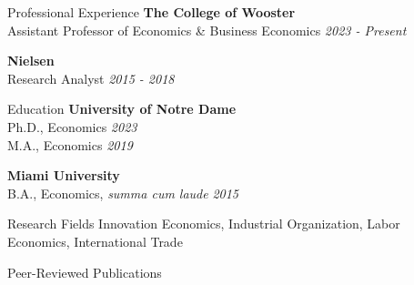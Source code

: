 \documentclass{resume} %
\begin{document}

\begin{rSection}{Professional Experience}
	{\bf The College of Wooster} \\ 
	Assistant Professor of Economics \& Business Economics \hfill {\em 2023 - Present}
	
	{\bf Nielsen}  \\
	Research Analyst \hfill {\em  2015 - 2018}
	 
\end{rSection}



\begin{rSection}{Education}
{\bf University of Notre Dame} \\ 
Ph.D., Economics \hfill {\em 2023} \\
M.A., Economics \hfill {\em 2019} 

{\bf Miami University}  \\
B.A., Economics, \textit{summa cum laude} \hfill {\em  2015}
 
\end{rSection}
 \begin{rSection}{Research Fields}
 	Innovation Economics, Industrial Organization, Labor Economics, International Trade
 \end{rSection}

\begin{rSection}{Peer-Reviewed Publications}
	 \medskip \\
	 \medskip \\
\end{rSection}	

\end{document}
